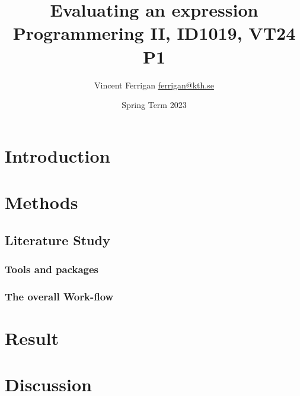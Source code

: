 \documentclass[a4paper,11pt]{article}
\begin{document}
\title{
    Evaluating an expression
\\\small{Programmering II, ID1019, VT24 P1}
}
\author{Vincent Ferrigan \href{mailto:ferrigan@kth.se}{ferrigan@kth.se}}

\date{Spring Term 2023}

\maketitle

\section*{Introduction}
\label{sec:introduction}

\section*{Methods}
\label{sec:methods}

\subsection*{Literature Study}
\label{subsec:literature}
\subsubsection*{Tools and packages}

\label{subsec:tools}
\subsubsection*{The overall Work-flow}

\label{subsec:workflow}
\section*{Result}
\label{sec:result}

\section*{Discussion}
\label{sec:discussion}
\end{document}
